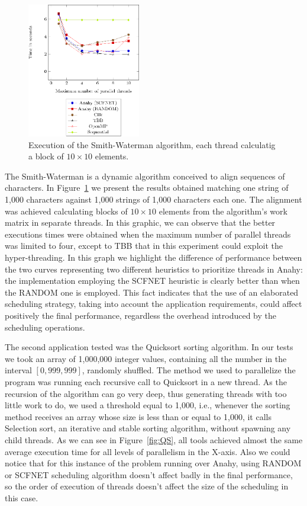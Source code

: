 \documentclass[twocolumn]{svjour3}
\begin{document}
\begin{figure}[]
	\centering	
	\includegraphics[width=0.44\textwidth,angle=0]{figs/sw_1000_10.eps}
	\caption{Execution of the Smith-Waterman algorithm, each thread calculatig a block of $10 \times 10$ elements.}
	\label{fig:SW}
\end{figure}

The Smith-Waterman is a dynamic algorithm conceived to align sequences of characters. In Figure~\ref{fig:SW} we present the results obtained matching one string of 1,000 characters against 1,000 strings of 1,000 characters each one. The alignment was achieved calculating blocks of $10 \times 10$ elements from the algorithm's work matrix in separate threads. In this graphic, we can observe that the better executions times were obtained when the maximum number of parallel threads was limited to four, except to TBB that in this experiment could exploit the hyper-threading. In this graph we highlight the difference of performance between the two curves representing two different heuristics to prioritize threads in Anahy: the implementation employing the SCFNET heuristic is clearly better than when the RANDOM one is employed. This fact indicates that the use of an elaborated scheduling strategy, taking into account the application requirements, could affect positively the final performance, regardless the overhead introduced by the scheduling operations.


The second application tested was the Quicksort sorting algorithm. In our tests we took an array of 1,000,000 integer values, containing all the number in the interval $[0, 999,999]$, randomly shuffled. The method we used to parallelize the program was running each recursive call to Quicksort in a new thread. As the recursion of the algorithm can go very deep, thus generating threads with too little work to do, we used a threshold equal to 1,000, i.e., whenever the sorting method receives an array whose size is less than or equal to 1,000, it calls Selection sort, an iterative and stable sorting algorithm, without spawning any child threads. As we can see in Figure~\ref{fig:QS}, all tools achieved almost the same average execution time for all levels of parallelism in the X-axis. Also we could notice that for this instance of the problem running over Anahy, using RANDOM or SCFNET scheduling algorithm doesn't affect badly in the final performance, so the order of execution of threads doesn't affect the size of the scheduling in this case.
\end{document}

